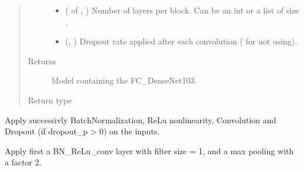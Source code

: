 \documentclass[letterpaper,10pt,english]{sphinxmanual}
\begin{document}
\begin{fulllineitems}
\begin{quote}
\begin{description}
\begin{itemize}
\item {} 
 ( of , ) \textendash{} Number of layers per block. Can be an int or a list of size .

\item {} 
 (, ) \textendash{} Dropout rate applied after each convolution ( for not using).

\end{itemize}

\item[{Returns}] \leavevmode
{} \textendash{} Model containing the FC\_DenseNet103.

\item[{Return type}] \leavevmode
{}

\end{description}\end{quote}

\end{fulllineitems}


\begin{fulllineitems}
\label{\detokenize{models/tiramisu:models.tiramisu.BN_ReLU_Conv}}
Apply successivly BatchNormalization, ReLu nonlinearity, Convolution and Dropout (if dropout\_p \textgreater{} 0) on the inputs.

\end{fulllineitems}


\begin{fulllineitems}
\label{\detokenize{models/tiramisu:models.tiramisu.TransitionDown}}
Apply first a BN\_ReLu\_conv layer with filter size = 1, and a max pooling with a factor 2.

\end{fulllineitems}
\end{document}
